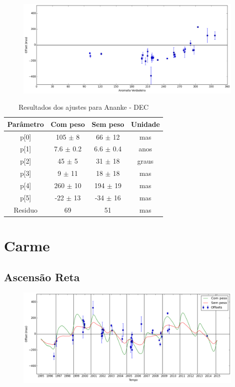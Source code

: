 \documentclass[11pt,a4paper]{report}
\begin{document}
\begin{figure}[h]
\includegraphics[scale=0.45]{Ananke/DEC_anom.png}  
\end{figure}

\begin{table}[h!]
\caption{\label{Tab: Ananke-DEC} Resultados dos ajustes para Ananke - DEC}
\begin{centering}
\begin{tabular}{cccc}
\hline
\hline
Parâmetro & Com peso & Sem peso & Unidade\tabularnewline
\hline
p[0] & 105 $\pm$ 8 & 66 $\pm$ 12 & mas\\
p[1] & 7.6 $\pm$ 0.2 & 6.6 $\pm$ 0.4 & anos\\
p[2] & 45 $\pm$ 5 & 31 $\pm$ 18 & graus\\
p[3] & 9 $\pm$ 11 & 18 $\pm$ 18 & mas\\
p[4] & 260 $\pm$ 10 & 194 $\pm$ 19 & mas\\
p[5] & -22 $\pm$ 13 & -34 $\pm$ 16 & mas\\
Residuo & 69 & 51 & mas\\
\hline 
\end{tabular} 
\par\end{centering}
\end{table}

\chapter*{Carme}
\section*{Ascensão Reta}

\begin{figure}[h]
\includegraphics[scale=0.45]{Carme/RA.png} 
\end{figure}
\end{document}
